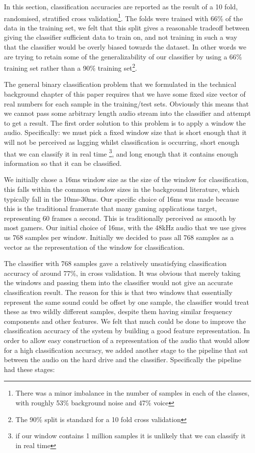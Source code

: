 \documentclass[ %
                    author={Sam Phippen},
                supervisor={Dr. Rafal Bogacz},
                     title={Real time voice activity detectors in noisy personal computing environments},
                  subtitle={},
                    degree={MEng},
                      year={2012} ]{thesis}
\begin{document}
In this section, classification accuracies are reported as the result of a 10
fold, randomised, stratified cross validation\footnote{There was a minor
    imbalance in the number of samples in each of the classes, with roughly
    53\% background noise and 47\% voice}.  The folds were trained with 66\% of
    the data in the training set, we felt that this split gives a reasonable
    tradeoff between giving the classifier sufficient data to train on, and not
    training in such a way that the classifier would be overly biased towards
    the dataset. In other words we are trying to retain some of the
    generalizability of our classifier by using a 66\% training set rather than
    a 90\% training set\footnote{The 90\% split is standard for a 10 fold cross
validation}.

The general binary classification problem that we formulated in the technical
background chapter of this paper requires that we have some fixed size vector
of real numbers for each sample in the training/test sets. Obviously this means
that we cannot pass some arbitrary length audio stream into the classifier and
attempt to get a result. The first order solution to this problem is to apply a
window the audio. Specifically: we must pick a fixed window size that is short
enough that it will not be perceived as lagging whilst classification is
occurring, short enough that we can classify it in real time \footnote{if our
window contains 1 million samples it is unlikely that we can classify it in
real time}, and long enough that it contains enough information so that it can
be classified.

We initially chose a 16ms window size as the size of the window for
classification, this falls within the common window sizes in the background
literature, which typically fall in the 10ms-30ms. Our specific choice of 16ms
was made because this is the traditional framerate that many gaming
applications target, representing 60 frames a second. This is traditionally
perceived as smooth by most gamers. Our initial choice of 16ms, with the 48kHz
audio that we use gives us 768 samples per window. Initially we decided to pass
all 768 samples as a vector as the representation of the window for
classification.

The classifier with 768 samples gave a relatively unsatisfying classification
accuracy of around 77\%, in cross validation. It was obvious that merely taking
the windows and passing them into the classifier would not give an accurate
classification result. The reason for this is that two windows that essentially
represent the same sound could be offset by one sample, the classifier would
treat these as two wildly different samples, despite them having similar
frequency components and other features. We felt that much could be done to
improve the classification accuracy of the system by building a good feature
representation. In order to allow easy construction of a representation of the
audio that would allow for a high classification accuracy, we added another
stage to the pipeline that sat between the audio on the hard drive and the
classifier. Specifically the pipeline had these stages:
\end{document}
